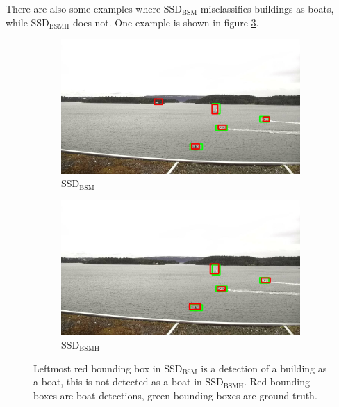 \noindent
There are also some examples where SSD$_{\text{BSM}}$ misclassifies buildings as boats, while SSD$_{\text{BSMH}}$ does not. One example is shown in figure \ref{img:misclass_ssd}.

\begin{figure}[h!]
\begin{subfigure}{.5\textwidth}
  \centering
  \includegraphics[width=0.9\linewidth]{results/case_buildings/misclass/selected_08_07_frame11982_bbnb.jpg}
  \caption{SSD$_{\text{BSM}}$}
  \label{fig:misclass_ssd2}
\end{subfigure}%
\begin{subfigure}{.5\textwidth}
  \centering
  \includegraphics[width=.9\linewidth]{results/case_buildings/misclass/selected_08_07_frame11982_build.jpg}
  \caption{SSD$_{\text{BSMH}}$}
  \label{fig:misclass_ssd3}
\end{subfigure}
\caption{Leftmost red bounding box in SSD$_{\text{BSM}}$ is a detection of a building as a boat, this is not detected as a boat in SSD$_{\text{BSMH}}$. Red bounding boxes are boat detections, green bounding boxes are ground truth.}
\label{img:misclass_ssd}
\end{figure}

\vspace{3mm}
\newpage

